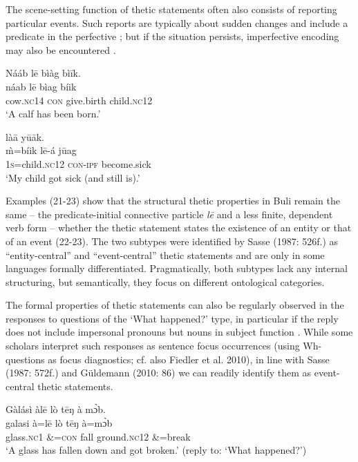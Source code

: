 \documentclass[output=paper]{langsci/langscibook}
\begin{document}
The scene-setting function of thetic statements often also consists of reporting particular events. Such reports are typically about sudden changes and include a predicate in the perfective ; but if the situation persists, imperfective encoding may also be encountered .

\ea\label{ex:schwarz:22}
\glll  Nááb    l\={e}  bìàg    bì\={i}k.\\
    \textup{náab}    l\={e}  bìag    {bíik}\\
       cow.\textsc{nc}14  \textsc{con}   give.birth  child.\textsc{nc}12\\
\glt ‘A calf has been born.’
\z

\ea\label{ex:schwarz:23}
      là\={a}    y\={u}\={a}k.\\
    \textup{\`{m}=bíik}      l\={e}-á    j\={u}ag\\
       1\textsc{s}=child.\textsc{nc}12    \textsc{con}-\textsc{ipf}  become.sick\\
\glt ‘My child got sick (and still is).’
\z

Examples (21-23) show that the structural thetic properties in Buli remain the same – the predicate-initial connective particle \textit{l\={e}} and a less finite, dependent verb form – whether the thetic statement states the existence of an entity  or that of an event (22-23). The two subtypes were identified by Sasse (1987: 526f.) as “entity-central” and “event-central” thetic statements and are only in some languages formally differentiated. Pragmatically, both subtypes lack any internal structuring, but semantically, they focus on different ontological categories.

The formal properties of thetic statements can also be regularly observed in the responses to questions of the ‘What happened?’ type, in particular if the reply does not include impersonal pronouns but nouns in subject function . While some scholars interpret such responses as sentence focus occurrences (using Wh-questions as focus diagnostics; cf. also Fiedler et al. 2010), in line with Sasse (1987: 572f.) and Güldemann (2010: 86) we can readily identify them as event-central thetic statements. 

\ea\label{ex:schwarz:24}
\glll   Gàlásì    àl\={e}    lò  t\={e}ŋ    {à   m\`{ɔ}b}.\\
    \textup{galasi} \textup{à=l\={e}}    lò  t\={e}ŋ    {à=mɔ̀b}\\
       glass.\textsc{nc}1  \&=\textsc{con}  fall  ground.\textsc{nc}12  \&=break\\
\glt ‘A glass has fallen down and got broken.’ (reply to: ‘What happened?’)
\z
\end{document}
